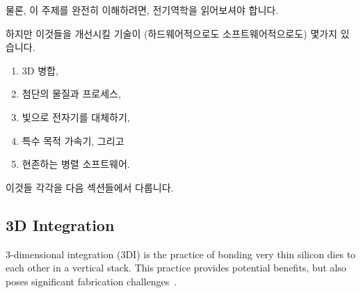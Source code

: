 {\begin{enumerate}
	\fi

	\end{enumerate}

	물론, 이 주제를 완전히 이해하려면, 전기역학을 읽어보셔야 합니다.

	\iffalse

	Of course, to fully understand this topic, you should read
	up on electrodynamics.

	\fi

}\QuickQuizEnd

하지만 이것들을 개선시킬 기술이 (하드웨어적으로도 소프트웨어적으로도) 몇가지
있습니다.

\begin{enumerate}
\item	3D 병합,
\item	첨단의 물질과 프로세스,
\item	빛으로 전자기를 대체하기,
\item	특수 목적 가속기, 그리고
\item	현존하는 병렬 소프트웨어.
\end{enumerate}

이것들 각각을 다음 섹션들에서 다룹니다.

\iffalse

There are nevertheless some technologies (both hardware and software)
that might help improve matters:

\begin{enumerate}
\item	3D integration,
\item	Novel materials and processes,
\item	Substituting light for electricity,
\item	Special-purpose accelerators, and
\item	Existing parallel software.
\end{enumerate}

Each of these is described in one of the following sections.

\fi

\subsection{3D Integration}
\label{sec:cpu:3D Integration}

3-dimensional integration (3DI) is the practice of bonding
very thin silicon dies to each other in a vertical stack.
This practice provides potential benefits, but also poses
significant fabrication challenges~\cite{JohnKnickerbocker2008:3DI}.

